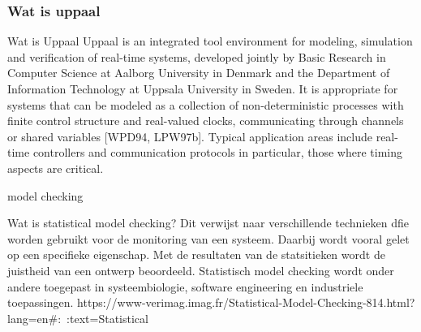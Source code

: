 \subsubsection{Wat is uppaal}

Wat is Uppaal
Uppaal is an integrated tool environment for modeling, simulation and verification of real-time systems, developed jointly by Basic Research in Computer Science at Aalborg University in Denmark and the Department of Information Technology at Uppsala University in Sweden. It is appropriate for systems that can be modeled as a collection of non-deterministic processes with finite control structure and real-valued clocks, communicating through channels or shared variables [WPD94, LPW97b]. Typical application areas include real-time controllers and communication protocols in particular, those where timing aspects are critical.


model checking

Wat is statistical model checking?
Dit verwijst naar verschillende technieken dfie worden gebruikt voor de monitoring van een systeem. Daarbij wordt vooral gelet op een specifieke eigenschap. Met de resultaten van de statsitieken wordt de juistheid van een ontwerp beoordeeld. Statistisch model checking wordt onder andere toegepast in systeembiologie, software engineering en industriele toepassingen.
https://www-verimag.imag.fr/Statistical-Model-Checking-814.html?lang=en#:~:text=Statistical%

